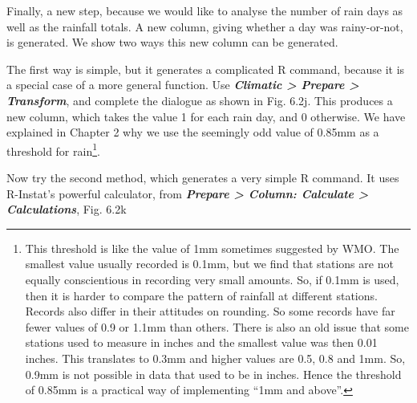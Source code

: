 \documentclass[
  letterpaper,
  DIV=11,
  numbers=noendperiod]{scrreprt}
\begin{document}
Finally, a new step, because we would like to analyse the number of rain
days as well as the rainfall totals. A new column, giving whether a day
was rainy-or-not, is generated. We show two ways this new column can be
generated.

The first way is simple, but it generates a complicated R command,
because it is a special case of a more general function. Use
\textbf{\emph{Climatic \textgreater{} Prepare \textgreater{}
Transform}}, and complete the dialogue as shown in Fig. 6.2j. This
produces a new column, which takes the value 1 for each rain day, and 0
otherwise. We have explained in Chapter 2 why we use the seemingly odd
value of 0.85mm as a threshold for rain\footnote{This threshold is like
  the value of 1mm sometimes suggested by WMO. The smallest value
  usually recorded is 0.1mm, but we find that stations are not equally
  conscientious in recording very small amounts. So, if 0.1mm is used,
  then it is harder to compare the pattern of rainfall at different
  stations. Records also differ in their attitudes on rounding. So some
  records have far fewer values of 0.9 or 1.1mm than others. There is
  also an old issue that some stations used to measure in inches and the
  smallest value was then 0.01 inches. This translates to 0.3mm and
  higher values are 0.5, 0.8 and 1mm. So, 0.9mm is not possible in data
  that used to be in inches. Hence the threshold of 0.85mm is a
  practical way of implementing ``1mm and above''.}.

Now try the second method, which generates a very simple R command. It
uses R-Instat's powerful calculator, from \textbf{\emph{Prepare
\textgreater{} Column: Calculate \textgreater{} Calculations}}, Fig.
6.2k
\end{document}

